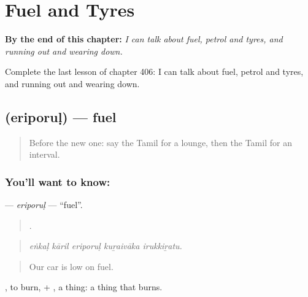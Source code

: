 
\chapter{Fuel and Tyres}
\label{ch:ta-fuel-and-tyres}

\begin{chapteropening}
\textbf{By the end of this chapter:} \emph{I can talk about fuel, petrol and tyres, and running out and wearing down.}

Complete the last lesson of chapter 406: I can talk about fuel, petrol and tyres, and running out and wearing down.
\end{chapteropening}

\section[\texorpdfstring{\ta{எரிபொருள்} (eriporuḷ)}{எரிபொருள் (eriporuḷ)}]{ (eriporuḷ) — fuel}

\label{lesson:TA-C406-eriporul}



\begin{quote}
Before the new one: say the Tamil for a lounge, then the Tamil for an interval.
\end{quote}

\subsection*{You'll want to know: }
\textbf{} — \emph{eriporuḷ} — \textquotedblleft{}fuel\textquotedblright{}.

\begin{quote}
    .
\end{quote}

\begin{quote}
\emph{eṅkaḷ kāril eriporuḷ kuṟaivāka irukkiṟatu.}
\end{quote}

\begin{quote}
Our car is low on fuel.
\end{quote}

, to burn, + , a thing: a thing that burns.

